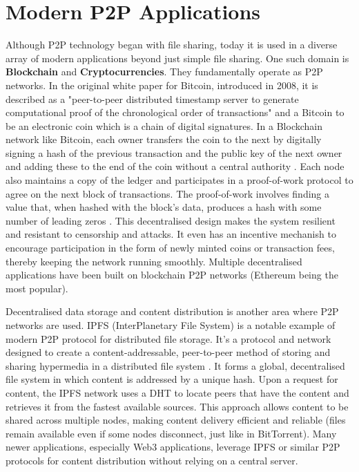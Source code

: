 \documentclass[12pt,a4paper]{report}
\begin{document}
\section{Modern P2P Applications}
Although P2P technology began with file sharing, today it is used in a diverse array of modern applications beyond just simple file sharing. One such domain is \textbf{Blockchain} and \textbf{Cryptocurrencies}. They fundamentally operate as P2P networks. In the original white paper for Bitcoin, introduced in 2008, it is described as a "peer-to-peer distributed timestamp server to generate computational proof of the chronological order of transactions" and a Bitcoin to be an electronic coin which is a chain of digital signatures. In a Blockchain network like Bitcoin, each owner transfers the coin to the next by digitally signing a hash of the previous transaction and the public key of the next owner and adding these to the end of the coin without a central authority \cite{bitcoin}. Each node also maintains a copy of the ledger and participates in a proof-of-work protocol to agree on the next block of transactions. The proof-of-work involves finding a value that, when hashed with the block's data, produces a hash with some number of leading zeros \cite{bitcoin}. This decentralised design makes the system resilient and resistant to censorship and attacks. It even has an incentive mechanish to encourage participation in the form of newly minted coins or transaction fees, thereby keeping the network running smoothly. Multiple decentralised applications have been built on blockchain P2P networks (Ethereum being the most popular).

Decentralised data storage and content distribution is another area where P2P networks are used. IPFS (InterPlanetary File System) is a notable example of modern P2P protocol for distributed file storage. It's a protocol and network designed to create a content-addressable, peer-to-peer method of storing and sharing hypermedia in a distributed file system \cite{IPFS}. It forms a global, decentralised file system in which content is addressed by a unique hash. Upon a request for content, the IPFS network uses a DHT to locate peers that have the content and retrieves it from the fastest available sources. This approach allows content to be shared across multiple nodes, making content delivery efficient and reliable (files remain available even if some nodes disconnect, just like in BitTorrent). Many newer applications, especially Web3 applications, leverage IPFS or similar P2P protocols for content distribution without relying on a central server.
\end{document}
